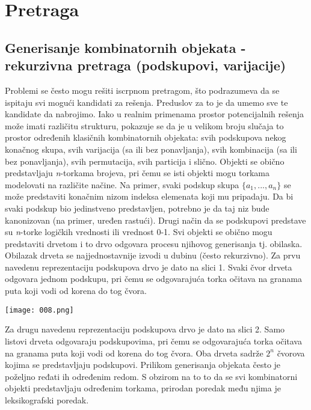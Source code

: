 \documentclass{article}
\begin{document}
\newpage

\section{Pretraga}
\subsection{Generisanje kombinatornih objekata - rekurzivna pretraga (podskupovi, varijacije)}
Problemi se često mogu rešiti iscrpnom pretragom, što podrazumeva da se ispitaju svi mogući kandidati za rešenja. Preduslov za to je
da umemo sve te kandidate da nabrojimo. Iako u realnim primenama prostor
potencijalnih rešenja može imati različitu strukturu, pokazuje se da je u velikom broju slučaja to prostor određenih klasičnih kombinatornih objekata: svih
podskupova nekog konačnog skupa, svih varijacija (sa ili bez ponavljanja), svih
kombinacija (sa ili bez ponavljanja), svih permutacija, svih particija i slično. 
\newline
Objekti se obično predstavljaju \textit{n}-torkama brojeva, pri čemu se isti objekti
mogu torkama modelovati na različite načine. Na primer, svaki podskup skupa
$\{a_1,..., a_n\}$ se može predstaviti konačnim nizom indeksa elemenata koji mu
pripadaju. Da bi svaki podskup bio jedinstveno predstavljen, potrebno je da
taj niz bude kanonizovan (na primer, uređen rastući). Drugi način da se podskupovi
predstave su \textit{n}-torke logičkih vrednosti ili vrednost 0-1. 
\newline
Svi objekti se obično mogu predstaviti drvetom i to drvo odgovara procesu
njihovog generisanja tj. obilaska. Obilazak drveta
se najjednostavnije izvodi u dubinu (često rekurzivno). Za prvu navedenu
reprezentaciju podskupova drvo je dato na slici 1. Svaki čvor drveta odgovara
jednom podskupu, pri čemu se odgovarajuća torka očitava na granama puta koji
vodi od korena do tog čvora.
\begin{center}
    \texttt{[image: 008.png]}
\end{center}
\newline
Za drugu navedenu reprezentaciju podskupova drvo je dato na slici 2. Samo
listovi drveta odgovaraju podskupovima, pri čemu se odgovarajuća torka očitava
na granama puta koji vodi od korena do tog čvora.
Oba drveta sadrže $2^n$ čvorova kojima se predstavljaju podskupovi.
\newline
Prilikom generisanja objekata često je poželjno ređati ih određenim redom. S
obzirom na to to da se svi kombinatorni objekti predstavljaju određenim torkama, prirodan poredak među njima je leksikografski poredak.
\end{document}
